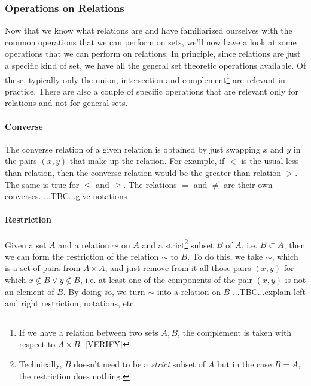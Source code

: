 \subsubsection{Operations on Relations}
Now that we know what relations are and have familiarized ourselves with the common operations that we can perform on sets, we'll now have a look at some operations that we can perform on relations. In principle, since relations are just a specific kind of set, we have all the general set theoretic operations available. Of these, typically only the union, intersection and complement\footnote{If we have a relation between two sets $A,B$, the complement is taken with respect to $A \times B$. [VERIFY]} are relevant in practice. There are also a couple of specific operations that are relevant only for relations and not for general sets.


\paragraph{Converse} The converse relation of a given relation is obtained by just swapping $x$ and $y$ in the pairs $(x,y)$ that make up the relation. For example, if $<$ is the usual less-than relation, then the converse relation would be the greater-than relation $>$. The same is true for $\leq$ and $\geq$. The relations $=$ and $\neq$ are their own converses. 
...TBC...give notations

\paragraph{Restriction}
Given a set $A$ and a relation $\sim$ on $A$ and a strict\footnote{Technically, $B$ doesn't need to be a \emph{strict} subset of $A$ but in the case $B=A$, the restriction does nothing.} subset $B$ of $A$, i.e. $B \subset A$, then we can form the restriction of the relation $\sim$ to $B$. To do this, we take $\sim$, which is a set of pairs from $A \times A$, and just remove from it all those pairs $(x,y)$ for which $x \notin B \vee y \notin B$, i.e. at least one of the components of the pair $(x,y)$ is not an element of $B$. By doing so, we turn $\sim$ into a relation on $B$
...TBC...explain left and right restriction, notations, etc.



